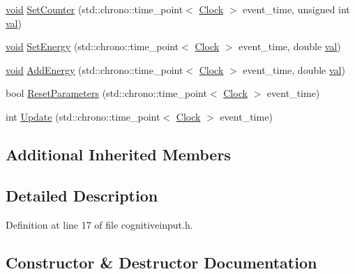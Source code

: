 \begin{DoxyCompactItemize}
\item 
\mbox{\hyperlink{glad_8h_a950fc91edb4504f62f1c577bf4727c29}{void}} \mbox{\hyperlink{class_cognitive_input_a4f09c1f176b5406d95a14d7cb1ab75e6}{Set\+Counter}} (std\+::chrono\+::time\+\_\+point$<$ \mbox{\hyperlink{universe_8h_a0ef8d951d1ca5ab3cfaf7ab4c7a6fd80}{Clock}} $>$ event\+\_\+time, unsigned int \mbox{\hyperlink{glad_8h_a26942fd2ed566ef553eae82d2c109c8f}{val}})
\item 
\mbox{\hyperlink{glad_8h_a950fc91edb4504f62f1c577bf4727c29}{void}} \mbox{\hyperlink{class_cognitive_input_a3498a8b5333606ef4d089e6c427ddf74}{Set\+Energy}} (std\+::chrono\+::time\+\_\+point$<$ \mbox{\hyperlink{universe_8h_a0ef8d951d1ca5ab3cfaf7ab4c7a6fd80}{Clock}} $>$ event\+\_\+time, double \mbox{\hyperlink{glad_8h_a26942fd2ed566ef553eae82d2c109c8f}{val}})
\item 
\mbox{\hyperlink{glad_8h_a950fc91edb4504f62f1c577bf4727c29}{void}} \mbox{\hyperlink{class_cognitive_input_a23f56d012233f655e1530ab61d80c27f}{Add\+Energy}} (std\+::chrono\+::time\+\_\+point$<$ \mbox{\hyperlink{universe_8h_a0ef8d951d1ca5ab3cfaf7ab4c7a6fd80}{Clock}} $>$ event\+\_\+time, double \mbox{\hyperlink{glad_8h_a26942fd2ed566ef553eae82d2c109c8f}{val}})
\item 
bool \mbox{\hyperlink{class_cognitive_input_a943605b820cc279533e19d24e11405c6}{Reset\+Parameters}} (std\+::chrono\+::time\+\_\+point$<$ \mbox{\hyperlink{universe_8h_a0ef8d951d1ca5ab3cfaf7ab4c7a6fd80}{Clock}} $>$ event\+\_\+time)
\item 
int \mbox{\hyperlink{class_cognitive_input_a93bd9d88194a545c9a85512edcbb6044}{Update}} (std\+::chrono\+::time\+\_\+point$<$ \mbox{\hyperlink{universe_8h_a0ef8d951d1ca5ab3cfaf7ab4c7a6fd80}{Clock}} $>$ event\+\_\+time)
\end{DoxyCompactItemize}
\subsection*{Additional Inherited Members}


\subsection{Detailed Description}


Definition at line 17 of file cognitiveinput.\+h.



\subsection{Constructor \& Destructor Documentation}
\mbox{\label{class_cognitive_input_a5c3c102dc3ec6cfec25eb849488e9782}} 
